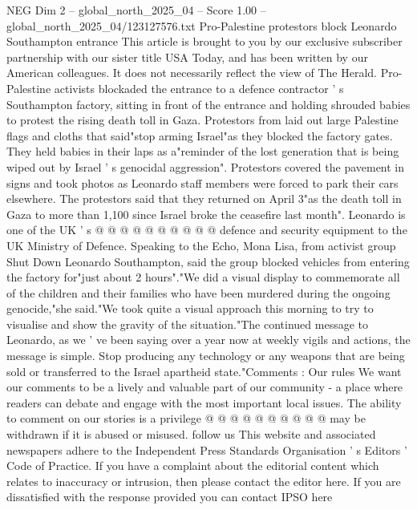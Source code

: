 \begin{textsample}{NEG Dim 2 – global\_north\_2025\_04 – Score 1.00 – global\_north\_2025\_04/123127576.txt}  \label{ex:f2_neg_023}
Pro-Palestine protestors block Leonardo Southampton entrance This article is brought to you by our exclusive subscriber partnership with our sister title USA Today, and has been written by our American colleagues.
It does not necessarily reflect the view of The Herald.
Pro-Palestine activists blockaded the entrance to a defence contractor ' s Southampton factory, sitting in front of the entrance and holding shrouded babies to protest the rising death toll in Gaza.
Protestors from laid out large Palestine flags and cloths that said"stop arming Israel"as they blocked the factory gates.
They held babies in their laps as a"reminder of the lost generation that is being wiped out by Israel ' s genocidal aggression".
Protestors covered the pavement in signs and took photos as Leonardo staff members were forced to park their cars elsewhere.
The protestors said that they returned on April 3"as the death toll in Gaza to more than 1,100 since Israel broke the ceasefire last month".
Leonardo is one of the UK ' s @ @ @ @ @ @ @ @ @ @ defence and security equipment to the UK Ministry of Defence.
Speaking to the Echo, Mona Lisa, from activist group Shut Down Leonardo Southampton, said the group blocked vehicles from entering the factory for"just about 2 hours"."We did a visual display to commemorate all of the children and their families who have been murdered during the ongoing genocide,"she said."We took quite a visual approach this morning to try to visualise and show the gravity of the situation."The continued message to Leonardo, as we ' ve been saying over a year now at weekly vigils and actions, the message is simple.
Stop producing any technology or any weapons that are being sold or transferred to the Israel apartheid state."Comments : Our rules We want our comments to be a lively and valuable part of our community - a place where readers can debate and engage with the most important local issues.
The ability to comment on our stories is a privilege @ @ @ @ @ @ @ @ @ @ may be withdrawn if it is abused or misused. follow us This website and associated newspapers adhere to the Independent Press Standards Organisation ' s Editors ' Code of Practice.
If you have a complaint about the editorial content which relates to inaccuracy or intrusion, then please contact the editor here.
If you are dissatisfied with the response provided you can contact IPSO here

\end{textsample}
